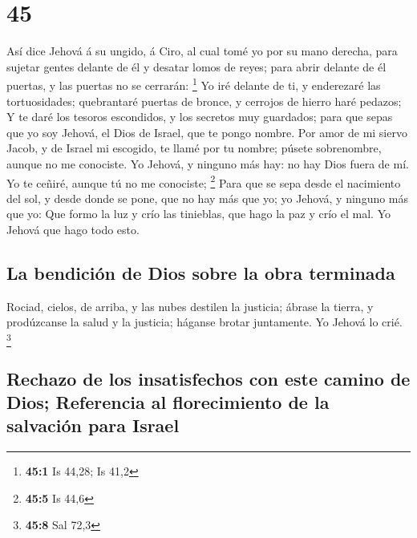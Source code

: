 \hypertarget{section-44}{%
\section{45}\label{section-44}}

 Así dice Jehová á su ungido, á Ciro, al cual tomé yo por su
mano derecha, para sujetar gentes delante de él y desatar lomos de
reyes; para abrir delante de él puertas, y las puertas no se cerrarán:
\footnote{\textbf{45:1} Is 44,28; Is 41,2}  Yo iré delante
de ti, y enderezaré las tortuosidades; quebrantaré puertas de bronce, y
cerrojos de hierro haré pedazos;  Y te daré los tesoros
escondidos, y los secretos muy guardados; para que sepas que yo soy
Jehová, el Dios de Israel, que te pongo nombre.  Por amor de
mi siervo Jacob, y de Israel mi escogido, te llamé por tu nombre; púsete
sobrenombre, aunque no me conociste.  Yo Jehová, y ninguno
más hay: no hay Dios fuera de mí. Yo te ceñiré, aunque tú no me
conociste; \footnote{\textbf{45:5} Is 44,6}  Para que se
sepa desde el nacimiento del sol, y desde donde se pone, que no hay más
que yo; yo Jehová, y ninguno más que yo:  Que formo la luz y
crío las tinieblas, que hago la paz y crío el mal. Yo Jehová que hago
todo esto.

\hypertarget{la-bendiciuxf3n-de-dios-sobre-la-obra-terminada}{%
\subsection{La bendición de Dios sobre la obra
terminada}\label{la-bendiciuxf3n-de-dios-sobre-la-obra-terminada}}

 Rociad, cielos, de arriba, y las nubes destilen la
justicia; ábrase la tierra, y prodúzcanse la salud y la justicia;
háganse brotar juntamente. Yo Jehová lo crié. \footnote{\textbf{45:8}
  Sal 72,3}

\hypertarget{rechazo-de-los-insatisfechos-con-este-camino-de-dios-referencia-al-florecimiento-de-la-salvaciuxf3n-para-israel}{%
\subsection{Rechazo de los insatisfechos con este camino de Dios;
Referencia al florecimiento de la salvación para
Israel}\label{rechazo-de-los-insatisfechos-con-este-camino-de-dios-referencia-al-florecimiento-de-la-salvaciuxf3n-para-israel}}

